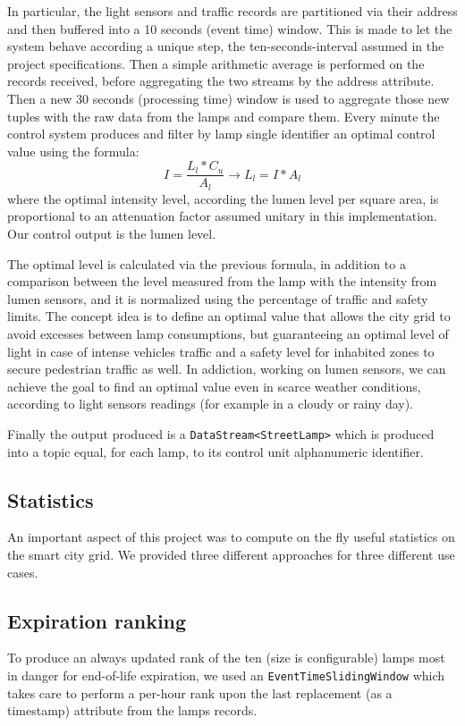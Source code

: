 In particular, the light sensors and traffic records are partitioned via their address and then buffered into a 10 seconds (event time) window. This is made to let the system behave according a unique step, the ten-seconds-interval assumed in the project specifications. Then a simple arithmetic average is performed on the records received, before aggregating the two streams by the address attribute. Then a new 30 seconds (processing time) window is used to aggregate those new tuples with the raw data from the lamps and compare them. Every minute the control system produces and filter by lamp single identifier an optimal control value using the formula:
	$$I = \frac{L_l*C_u}{A_l} \rightarrow L_l = I * A_l$$
where the optimal intensity level, according the lumen level per square area, is proportional to an attenuation factor assumed unitary in this implementation. Our control output is the lumen level.

The optimal level is calculated via the previous formula, in addition to a comparison between the level measured from the lamp with the intensity from lumen sensors, and it is normalized using the percentage of traffic and safety limits. The concept idea is to define an optimal value that allows the city grid to avoid excesses between lamp consumptions, but guaranteeing an optimal level of light in case of intense vehicles traffic and a safety level for inhabited zones to secure pedestrian traffic as well. In addiction, working on lumen sensors, we can achieve the goal to find an optimal value even in scarce weather conditions, according to light sensors readings (for example in a cloudy or rainy day).

Finally the output produced is a \texttt{DataStream<StreetLamp>} which is produced into a topic equal, for each lamp, to its control unit alphanumeric identifier.

\subsection{Statistics}
An important aspect of this project was to compute on the fly useful statistics on the smart city grid. We provided three different approaches for three different use cases.
\subsection*{Expiration ranking}
To produce an always updated rank of the ten (size is configurable) lamps most in danger for end-of-life expiration, we used an \texttt{EventTimeSlidingWindow} which takes care to perform a per-hour rank upon the last replacement (as a timestamp) attribute from the lamps records.
